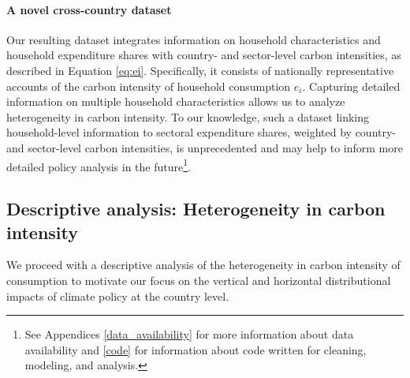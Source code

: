 \documentclass[12pt, a4paper]{article}
\begin{document}
\paragraph{A novel cross-country dataset} 

Our resulting dataset integrates information on household characteristics and household expenditure shares with country- and sector-level carbon intensities, as described in Equation \ref{eq:ei}. Specifically, it consists of nationally representative accounts of the carbon intensity of household consumption $e_{i}$. Capturing detailed information on multiple household characteristics allows us to analyze heterogeneity in carbon intensity. To our knowledge, such a dataset linking household-level information to sectoral expenditure shares, weighted by country- and sector-level carbon intensities, is unprecedented and may help to inform more detailed policy analysis in the future\footnote{See Appendices \ref{data_availability} for more information about data availability and \ref{code} for information about code written for cleaning, modeling, and analysis.}.

\subsection{Descriptive analysis: Heterogeneity in carbon intensity} \label{sec:descriptive}

We proceed with a descriptive analysis of the heterogeneity in carbon intensity of consumption to motivate our focus on the vertical and horizontal distributional impacts of climate policy at the country level.
\end{document}
